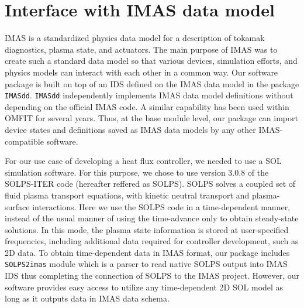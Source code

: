 \section{Interface with IMAS data model}{\label{sec:infrastructure}} 
IMAS is a standardized physics data model\cite{Imbeaux_2015} for a description of tokamak diagnostics, plasma state, and actuators. The main purpose of IMAS was to create such a standard data model so that various devices, simulation efforts, and physics models can interact with each other in a common way. Our software package is built on top of an \ac{IDS} defined on the IMAS data model in the package \texttt{IMASdd}\cite{meneghini2023}. \texttt{IMASdd} independently implements IMAS data model definitions without depending on the official IMAS code. A similar capability has been used within OMFIT\cite{meneghini_2015_nf} for several years. Thus, at the base module level, our package can import device states and definitions saved as IMAS data models by any other IMAS-compatible software.

For our use case of developing a heat flux controller, we needed to use a \ac{SOL} simulation software. For this purpose, we chose to use version 3.0.8 of the SOLPS-ITER code (hereafter reffered as SOLPS). SOLPS solves a coupled set of fluid plasma transport equations, with kinetic neutral transport and plasma-surface interactions. Here we use the SOLPS code in a time-dependent manner\cite{Lore_2023}, instead of the usual manner of using the time-advance only to obtain steady-state solutions. In this mode, the plasma state information is stored at user-specified frequencies, including additional data required for controller development, such as 2D data. To obtain time-dependent data in IMAS format, our package includes \texttt{SOLPS2imas} module which is a parser to read native SOLPS output into IMAS IDS thus completing the connection of SOLPS to the IMAS project. However, our software provides easy access to utilize any time-dependent 2D \ac{SOL} model as long as it outputs data in IMAS data schema.

